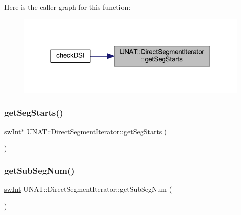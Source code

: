 Here is the caller graph for this function\+:
\nopagebreak
\begin{figure}[H]
\begin{center}
\leavevmode
\includegraphics[width=318pt]{classUNAT_1_1DirectSegmentIterator_a125018398a70e40dbb02b56316efbf5a_icgraph}
\end{center}
\end{figure}
\mbox{\label{classUNAT_1_1DirectSegmentIterator_a125018398a70e40dbb02b56316efbf5a}} 
\subsubsection{\texorpdfstring{getSegStarts()}{getSegStarts()}\hspace{0.1cm}{\footnotesize\ttfamily [2/2]}}
{\footnotesize\ttfamily \mbox{\hyperlink{include_2swMacro_8h_a113cf5f6b5377cdf3fac6aa4e443e9aa}{sw\+Int}}$\ast$ U\+N\+A\+T\+::\+Direct\+Segment\+Iterator\+::get\+Seg\+Starts (\begin{DoxyParamCaption}{ }\end{DoxyParamCaption})\hspace{0.3cm}{\ttfamily [inline]}}

\mbox{\label{classUNAT_1_1DirectSegmentIterator_a8aced068087f2492ad30376d6cec1294}} 
\subsubsection{\texorpdfstring{getSubSegNum()}{getSubSegNum()}\hspace{0.1cm}{\footnotesize\ttfamily [1/2]}}
{\footnotesize\ttfamily \mbox{\hyperlink{include_2swMacro_8h_a113cf5f6b5377cdf3fac6aa4e443e9aa}{sw\+Int}} U\+N\+A\+T\+::\+Direct\+Segment\+Iterator\+::get\+Sub\+Seg\+Num (\begin{DoxyParamCaption}{ }\end{DoxyParamCaption})\hspace{0.3cm}{\ttfamily [inline]}}

